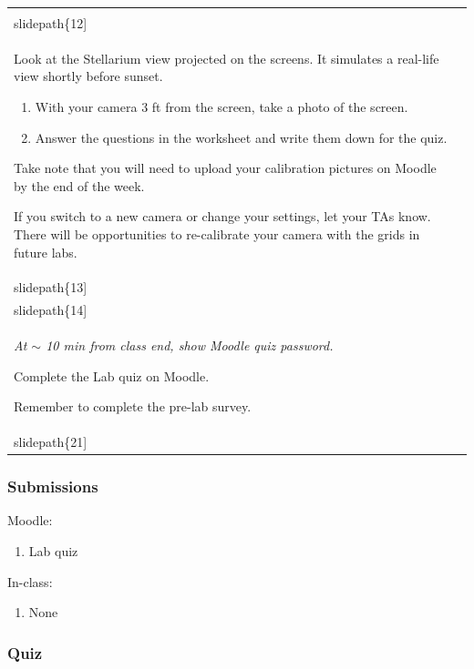 \documentclass[12pt]{article}
\begin{document}
\begin{longtable}{|m{}|m{}|}
\texttt{[image: \\slidepath\{12]}}\\\hline
Look at the Stellarium view projected on the screens. It simulates a real-life view shortly before sunset. 

\begin{enumerate}
\item With your camera 3 ft from the screen, take a photo of the screen.
\item Answer the questions in the worksheet and write them down for the quiz. 
\end{enumerate}

Take note that you will need to upload your calibration pictures on Moodle by the end of the week. 

If you switch to a new camera or change your settings, let your TAs know. There will be opportunities to re-calibrate your camera with the grids in future labs.
 & \texttt{[image: \\slidepath\{13]}}

\texttt{[image: \\slidepath\{14]}}\\\hline
\emph{At $\sim$ 10 min from class end, show Moodle quiz password.} 

Complete the Lab quiz on Moodle.

Remember to complete the pre-lab survey. & \texttt{[image: \\slidepath\{21]}}\\\hline
\end{longtable}


\subsubsection{Submissions}

Moodle:
\begin{enumerate}
\item Lab quiz
\end{enumerate}

\noindent
In-class:
\begin{enumerate}
\item None
\end{enumerate}


\subsubsection{Quiz}
\end{document}
